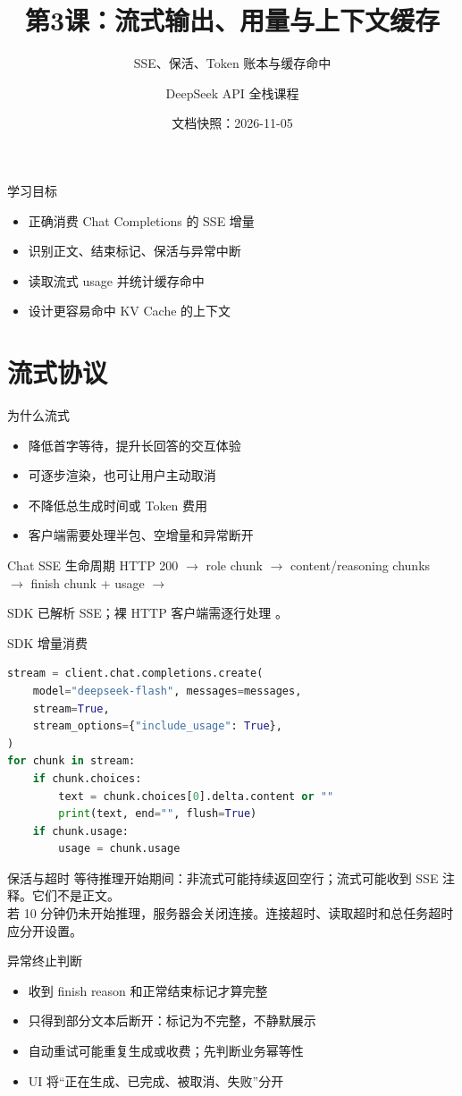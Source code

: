 \documentclass[aspectratio=169,UTF8]{ctexbeamer}
\title{第3课：流式输出、用量与上下文缓存}
\subtitle{SSE、保活、Token 账本与缓存命中}
\author{DeepSeek API 全栈课程}
\date{文档快照：2026-11-05}
\begin{document}
\frame{\titlepage}
\begin{frame}{学习目标}
\begin{itemize}
  \item 正确消费 Chat Completions 的 SSE 增量
  \item 识别正文、结束标记、保活与异常中断
  \item 读取流式 usage 并统计缓存命中
  \item 设计更容易命中 KV Cache 的上下文
\end{itemize}
\end{frame}
\section{流式协议}
\begin{frame}{为什么流式}
\begin{itemize}
  \item 降低首字等待，提升长回答的交互体验
  \item 可逐步渲染，也可让用户主动取消
  \item 不降低总生成时间或 Token 费用
  \item 客户端需要处理半包、空增量和异常断开
\end{itemize}
\end{frame}
\begin{frame}{Chat SSE 生命周期}
\centering
HTTP 200 $\rightarrow$ role chunk $\rightarrow$ content/reasoning chunks\\
$\rightarrow$ finish chunk + usage $\rightarrow$ 
\vspace{10pt}

SDK 已解析 SSE；裸 HTTP 客户端需逐行处理 。
\end{frame}
\begin{frame}[fragile]{SDK 增量消费}
\begin{lstlisting}[language=Python]
stream = client.chat.completions.create(
    model="deepseek-flash", messages=messages,
    stream=True,
    stream_options={"include_usage": True},
)
for chunk in stream:
    if chunk.choices:
        text = chunk.choices[0].delta.content or ""
        print(text, end="", flush=True)
    if chunk.usage:
        usage = chunk.usage
\end{lstlisting}
\end{frame}
\begin{frame}{保活与超时}
等待推理开始期间：非流式可能持续返回空行；流式可能收到  SSE 注释。它们不是正文。\\[8pt]
若 10 分钟仍未开始推理，服务器会关闭连接。连接超时、读取超时和总任务超时应分开设置。
\end{frame}
\begin{frame}{异常终止判断}
\begin{itemize}
  \item 收到 finish reason 和正常结束标记才算完整
  \item 只得到部分文本后断开：标记为不完整，不静默展示
  \item 自动重试可能重复生成或收费；先判断业务幂等性
  \item UI 将“正在生成、已完成、被取消、失败”分开
\end{itemize}
\end{frame}
\end{document}

